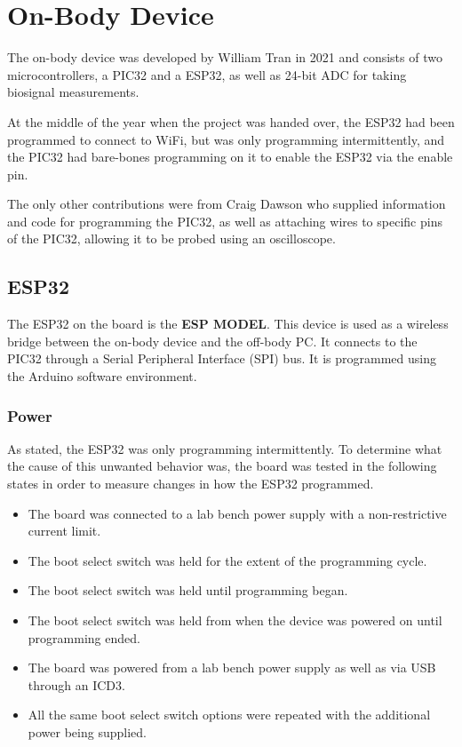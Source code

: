 \chapter{On-Body Device}
The on-body device was developed by William Tran in 2021 and consists of two microcontrollers,
a PIC32 and a ESP32, as well as 24-bit ADC for taking biosignal measurements.

At the middle of the year when the project was handed over,
the ESP32 had been programmed to connect to WiFi, but was only programming intermittently,
and the PIC32 had bare-bones programming on it to enable the ESP32 via the enable pin.

The only other contributions were from Craig Dawson who supplied information and code for programming the PIC32,
as well as attaching wires to specific pins of the PIC32, allowing it to be probed using an oscilloscope.


\section{ESP32}
The ESP32 on the board is the \textbf{ESP MODEL}.
This device is used as a wireless bridge between the on-body device and the off-body PC.
It connects to the PIC32 through a Serial Peripheral Interface (SPI) bus.
It is programmed using the Arduino software environment.

\subsection{Power}
As stated, the ESP32 was only programming intermittently.
To determine what the cause of this unwanted behavior was,
the board was tested in the following states in order to measure changes in how the ESP32 programmed.

\begin{itemize}
        \item The board was connected to a lab bench power supply with a non-restrictive current limit.
        \item The boot select switch was held for the extent of the programming cycle.
        \item The boot select switch was held until programming began.
        \item The boot select switch was held from when the device was powered on until programming ended.
        \item The board was powered from a lab bench power supply as well as via USB through an ICD3.
        \item All the same boot select switch options were repeated with the additional power being supplied.
\end{itemize}

